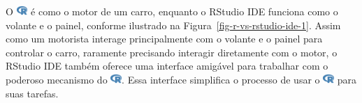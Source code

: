 \documentclass[
  letterpaper,
]{book}
\theoremstyle{definition}
\theoremstyle{plain}
\theoremstyle{remark}
\begin{document}
O
\includegraphics[width=1.13em,height=1em]{getting_started_with_r_files/figure-pdf/fa-icon-9b00320707d42527dde67262afb33ded.pdf}
é como o motor de um carro, enquanto o RStudio IDE funciona como o
volante e o painel, conforme ilustrado na
Figura~\ref{fig-r-vs-rstudio-ide-1}. Assim como um motorista interage
principalmente com o volante e o painel para controlar o carro,
raramente precisando interagir diretamente com o motor, o RStudio IDE
também oferece uma interface amigável para trabalhar com o poderoso
mecanismo do
\includegraphics[width=1.13em,height=1em]{getting_started_with_r_files/figure-pdf/fa-icon-9b00320707d42527dde67262afb33ded.pdf}.
Essa interface simplifica o processo de usar o
\includegraphics[width=1.13em,height=1em]{getting_started_with_r_files/figure-pdf/fa-icon-9b00320707d42527dde67262afb33ded.pdf}
para suas tarefas.
\end{document}
